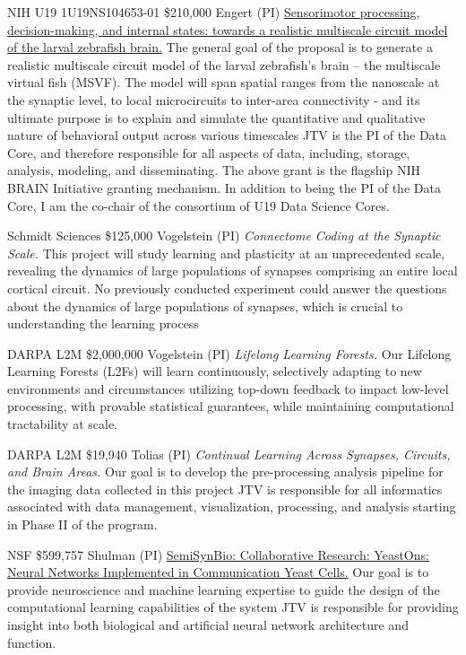 \documentclass[10pt,colorlinks=true,urlcolor=blue]{moderncv}
\begin{document}
    {NIH U19 1U19NS104653-01}%
    {\$210,000}%
    {Engert (PI)}
    {\href{http://grantome.com/grant/NIH/U19-NS104653-02}%
    {Sensorimotor processing, decision-making, and internal states: towards a realistic multiscale circuit model of the larval zebrafish brain.} 
    The general goal of the proposal is to generate a realistic multiscale circuit model of the larval zebrafish’s brain – the multiscale virtual fish (MSVF). The model will span spatial ranges from the nanoscale at the synaptic level, to local microcircuits to inter-area connectivity - and its ultimate purpose is to explain and simulate the quantitative and qualitative nature of behavioral output across various timescales}%
    {JTV is the PI of the Data Core, and therefore responsible for all aspects of data, including, storage, analysis, modeling, and disseminating.}
    {The above grant is the flagship NIH BRAIN Initiative granting mechanism.  In addition to being the PI of the Data Core, I am the co-chair of the consortium of U19 Data Science Cores.}


    {Schmidt Sciences}%
    {\$125,000}%
    {Vogelstein (PI)}
    {\emph{Connectome Coding at the Synaptic Scale.} 
    This project will study learning and plasticity at an unprecedented scale, revealing the dynamics of large populations of synapses comprising an entire local cortical circuit. No previously conducted experiment could answer the questions about the dynamics of large populations of synapses, which is crucial to understanding the learning process}%
    {}
    {}

    {DARPA L2M}%
    {\$2,000,000}%
    {Vogelstein (PI)}
    {\emph{Lifelong Learning Forests.}
    Our Lifelong Learning Forests (L2Fs) will learn continuously, selectively adapting to new environments and circumstances utilizing top-down feedback to impact low-level processing, with provable statistical guarantees, while maintaining computational tractability at scale.  }%
    {}
    {}

    {DARPA L2M}%
    {\$19,940}%
    {Tolias (PI)}    
    {\emph{Continual Learning Across Synapses, Circuits, and Brain Areas.}
    Our  goal is to develop the pre-processing analysis pipeline for the imaging data collected in this project}%
    {JTV is responsible for all informatics associated with data management, visualization, processing, and analysis starting in Phase II of the program.}
    {}

    {NSF}%
    {\$599,757}%
    {Shulman (PI)}
    {\href{http://grantome.com/grant/NSF/MCB-1807546}%
    {SemiSynBio: Collaborative Research: YeastOns: Neural Networks Implemented in Communication Yeast Cells.}
    Our goal is to provide neuroscience and machine learning expertise to guide the design of the computational learning capabilities of the system}%
    {JTV is responsible for providing insight into both biological and artificial neural network architecture and function.}
    {}
\end{document}
